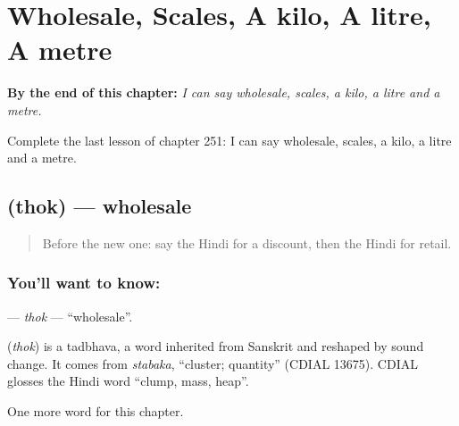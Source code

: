 
\chapter{Wholesale, Scales, A kilo, A litre, A metre}
\label{ch:hi-wholesale-scales-a-kilo-a-litre-a-metre}

\begin{chapteropening}
\textbf{By the end of this chapter:} \emph{I can say wholesale, scales, a kilo, a litre and a metre.}

Complete the last lesson of chapter 251: I can say wholesale, scales, a kilo, a litre and a metre.
\end{chapteropening}

\section[\texorpdfstring{\hi{थोक} (thok)}{थोक (thok)}]{ (thok) — wholesale}

\label{lesson:HI-C251-thok}



\begin{quote}
Before the new one: say the Hindi for a discount, then the Hindi for retail.
\end{quote}

\subsection*{You'll want to know: }
\textbf{} — \emph{thok} — \textquotedblleft{}wholesale\textquotedblright{}.

\begin{cousinweb}
\textbf{} (\emph{thok}) is a tadbhava, a word inherited from Sanskrit and reshaped by sound change. It comes from \emph{stabaka}, \textquotedblleft{}cluster; quantity\textquotedblright{} (CDIAL 13675). CDIAL glosses the Hindi word \textquotedblleft{}clump, mass, heap\textquotedblright{}.
\end{cousinweb}

\begin{grammarlens}[title={What you've built}]
One more word for this chapter.
\end{grammarlens}

